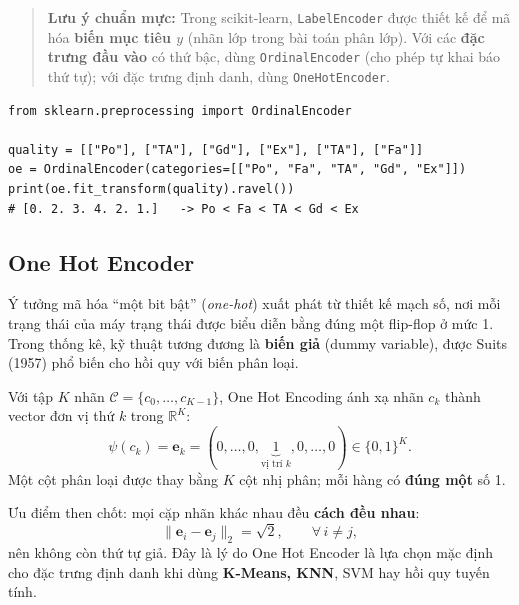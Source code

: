 \begin{quote}
\textbf{Lưu ý chuẩn mực:} Trong scikit-learn, \texttt{LabelEncoder} được thiết kế để mã hóa \textbf{biến mục tiêu $y$} (nhãn lớp trong bài toán phân lớp). Với các \textbf{đặc trưng đầu vào} có thứ bậc, dùng \texttt{OrdinalEncoder} (cho phép tự khai báo thứ tự); với đặc trưng định danh, dùng \texttt{OneHotEncoder}.
\end{quote}

\begin{lstlisting}[caption={Ordinal Encoder với thứ tự do người dùng khai báo}]
from sklearn.preprocessing import OrdinalEncoder

quality = [["Po"], ["TA"], ["Gd"], ["Ex"], ["TA"], ["Fa"]]
oe = OrdinalEncoder(categories=[["Po", "Fa", "TA", "Gd", "Ex"]])
print(oe.fit_transform(quality).ravel())
# [0. 2. 3. 4. 2. 1.]   -> Po < Fa < TA < Gd < Ex
\end{lstlisting}

\subsection{One Hot Encoder}

Ý tưởng mã hóa ``một bit bật'' (\textit{one-hot}) xuất phát từ thiết kế mạch số, nơi mỗi trạng thái của máy trạng thái được biểu diễn bằng đúng một flip-flop ở mức 1. Trong thống kê, kỹ thuật tương đương là \textbf{biến giả} (dummy variable), được Suits (1957) phổ biến cho hồi quy với biến phân loại.

\begin{definition}
Với tập $K$ nhãn $\mathcal{C} = \{c_0, \dots, c_{K-1}\}$, One Hot Encoding ánh xạ nhãn $c_k$ thành vector đơn vị thứ $k$ trong $\mathbb{R}^K$:
\begin{equation}
    \psi(c_k) = \mathbf{e}_k = (0, \dots, 0, \underbrace{1}_{\text{vị trí } k}, 0, \dots, 0) \in \{0,1\}^K .
\end{equation}
Một cột phân loại được thay bằng $K$ cột nhị phân; mỗi hàng có \textbf{đúng một} số 1.
\end{definition}

Ưu điểm then chốt: mọi cặp nhãn khác nhau đều \textbf{cách đều nhau}:
\begin{equation}
    \| \mathbf{e}_i - \mathbf{e}_j \|_2 = \sqrt{2}, \qquad \forall\, i \neq j ,
\end{equation}
nên không còn thứ tự giả. Đây là lý do One Hot Encoder là lựa chọn mặc định cho đặc trưng định danh khi dùng \textbf{K-Means, KNN}, SVM hay hồi quy tuyến tính.

